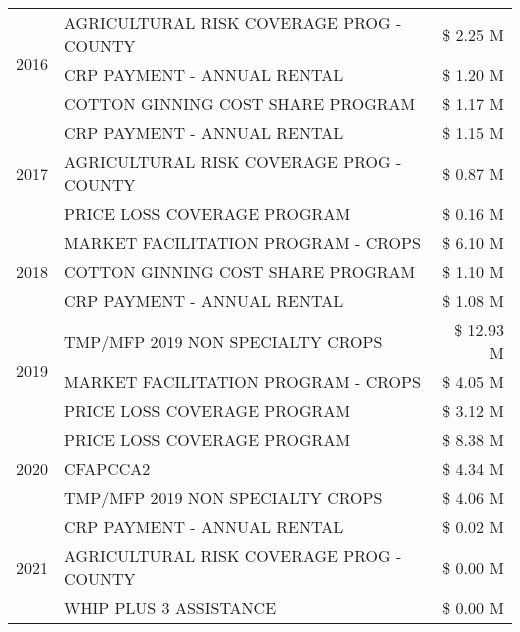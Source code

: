 \begin{tabular}{llr}
\multirow[t]{3}{*}{2016} & AGRICULTURAL RISK COVERAGE PROG - COUNTY & \$ 2.25 M \\
 & CRP PAYMENT - ANNUAL RENTAL & \$ 1.20 M \\
 & COTTON GINNING COST SHARE PROGRAM & \$ 1.17 M \\
\cline{1-3}
\multirow[t]{3}{*}{2017} & CRP PAYMENT - ANNUAL RENTAL & \$ 1.15 M \\
 & AGRICULTURAL RISK COVERAGE PROG - COUNTY & \$ 0.87 M \\
 & PRICE LOSS COVERAGE PROGRAM & \$ 0.16 M \\
\cline{1-3}
\multirow[t]{3}{*}{2018} & MARKET FACILITATION PROGRAM - CROPS & \$ 6.10 M \\
 & COTTON GINNING COST SHARE PROGRAM & \$ 1.10 M \\
 & CRP PAYMENT - ANNUAL RENTAL & \$ 1.08 M \\
\cline{1-3}
\multirow[t]{3}{*}{2019} & TMP/MFP 2019 NON SPECIALTY CROPS & \$ 12.93 M \\
 & MARKET FACILITATION PROGRAM - CROPS & \$ 4.05 M \\
 & PRICE LOSS COVERAGE PROGRAM & \$ 3.12 M \\
\cline{1-3}
\multirow[t]{3}{*}{2020} & PRICE LOSS COVERAGE PROGRAM & \$ 8.38 M \\
 & CFAPCCA2 & \$ 4.34 M \\
 & TMP/MFP 2019 NON SPECIALTY CROPS & \$ 4.06 M \\
\cline{1-3}
\multirow[t]{3}{*}{2021} & CRP PAYMENT - ANNUAL RENTAL & \$ 0.02 M \\
 & AGRICULTURAL RISK COVERAGE PROG - COUNTY & \$ 0.00 M \\
 & WHIP PLUS 3 ASSISTANCE & \$ 0.00 M \\
\cline{1-3}
\bottomrule
\end{tabular}
